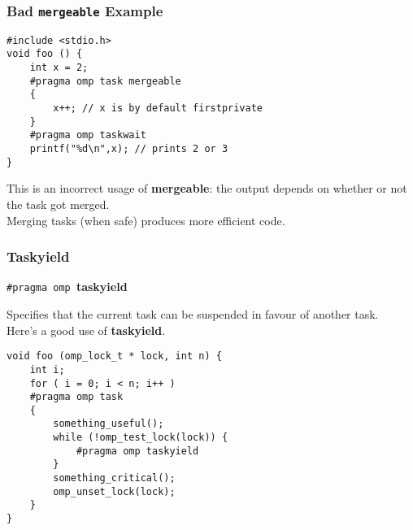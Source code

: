 \documentclass[aspectratio=43]{beamer}
\newenvironment{changemargin}[1]{%
  \begin{list}{}{%
    \setlength{\topsep}{0pt}%
    \setlength{\leftmargin}{#1}%
    \setlength{\rightmargin}{1em}
    \setlength{\listparindent}{\parindent}%
    \setlength{\itemindent}{\parindent}%
    \setlength{\parsep}{\parskip}%
  }%
  \item[]}{\end{list}}
\begin{document}
\begin{frame}[fragile]
  \frametitle{Bad {\tt mergeable} Example}

  \begin{changemargin}{1cm}
  \begin{lstlisting}
#include <stdio.h>
void foo () {
    int x = 2;
    #pragma omp task mergeable
    {
        x++; // x is by default firstprivate
    }
    #pragma omp taskwait
    printf("%d\n",x); // prints 2 or 3
}
  \end{lstlisting}
  
    This is an incorrect usage of {\bf mergeable}: the output depends
      on whether or not the task got merged.\\[1em]
    Merging tasks (when safe) produces more efficient code.

  \end{changemargin}
\end{frame}

\begin{frame}[fragile]
  \frametitle{Taskyield}

  \begin{changemargin}{1.5cm}
  \begin{center}
    {\tt \#pragma omp }{\bf taskyield}
  \end{center}

    Specifies that the current task can be suspended in favour of another task.\\[1em]

  Here's a good use of {\bf taskyield}.

  \begin{lstlisting}
void foo (omp_lock_t * lock, int n) {
    int i;
    for ( i = 0; i < n; i++ )
    #pragma omp task
    {
        something_useful();
        while (!omp_test_lock(lock)) {
            #pragma omp taskyield
        }
        something_critical();
        omp_unset_lock(lock);
    }
}
  \end{lstlisting}
  \end{changemargin}
\end{frame}
\end{document}
